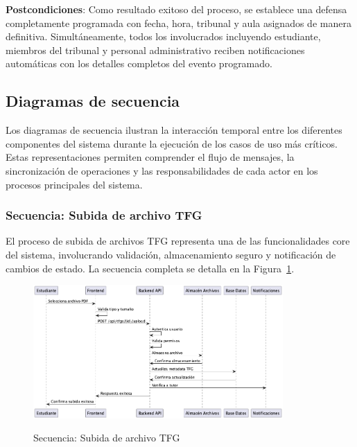 \documentclass[12pt,a4paper,oneside]{report}
\providecommand{\pandocbounded}[1]{#1}
\begin{document}
\textbf{Postcondiciones}: Como resultado exitoso del proceso, se establece una defensa completamente programada con fecha, hora, tribunal y aula asignados de manera definitiva. Simultáneamente, todos los involucrados incluyendo estudiante, miembros del tribunal y personal administrativo reciben notificaciones automáticas con los detalles completos del evento programado.

\subsection{Diagramas de secuencia}\label{diagramas-de-secuencia}

Los diagramas de secuencia ilustran la interacción temporal entre los diferentes componentes del sistema durante la ejecución de los casos de uso más críticos. Estas representaciones permiten comprender el flujo de mensajes, la sincronización de operaciones y las responsabilidades de cada actor en los procesos principales del sistema.

\subsubsection{Secuencia: Subida de archivo
TFG}\label{secuencia-subida-de-archivo-tfg}

El proceso de subida de archivos TFG representa una de las funcionalidades core del sistema, involucrando validación, almacenamiento seguro y notificación de cambios de estado. La secuencia completa se detalla en la Figura~\ref{fig:secuencia-subida-archivo}.

\begin{figure}[H]
\centering
\pandocbounded{\includegraphics[keepaspectratio,width=0.85\textwidth,alt={Secuencia: Subida de archivo TFG}]{processed/images/04_analisis_sistema_plantuml_1.png}}
\caption{Secuencia: Subida de archivo TFG}
\label{fig:secuencia-subida-archivo}
\end{figure}
\end{document}
